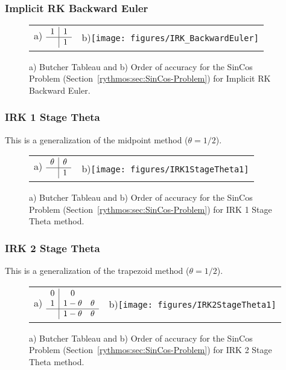 \subsubsection{Implicit RK Backward Euler}

\begin{figure}[H]
\centering{}%
\begin{tabular}{cc}
a) $\begin{array}{c|c}
1 & 1\\
\hline  & 1
\end{array}$ & b)\texttt{[image: figures/IRK\_BackwardEuler]}\tabularnewline
\end{tabular}\caption{a) Butcher Tableau and b) Order of accuracy for the SinCos Problem
(Section~\ref{rythmos:sec:SinCos-Problem}) for Implicit RK Backward
Euler.}
\end{figure}


\subsubsection{IRK 1 Stage Theta}

This is a generalization of the midpoint method ($\theta=1/2$).

\begin{figure}[H]
\centering{}%
\begin{tabular}{cc}
a) $\begin{array}{c|c}
\theta & \theta\\
\hline  & 1
\end{array}$ & b)\texttt{[image: figures/IRK1StageTheta1]}\tabularnewline
\end{tabular}\caption{a) Butcher Tableau and b) Order of accuracy for the SinCos Problem
(Section~\ref{rythmos:sec:SinCos-Problem}) for IRK 1 Stage Theta
method.}
\end{figure}


\subsubsection{IRK 2 Stage Theta}

This is a generalization of the trapezoid method ($\theta=1/2$).

\begin{figure}[H]
\centering{}%
\begin{tabular}{cc}
a) $\begin{array}{c|cc}
0 & 0\\
1 & 1-\theta & \theta\\
\hline  & 1-\theta & \theta
\end{array}$ & b)\texttt{[image: figures/IRK2StageTheta1]}\tabularnewline
\end{tabular}\caption{a) Butcher Tableau and b) Order of accuracy for the SinCos Problem
(Section~\ref{rythmos:sec:SinCos-Problem}) for IRK 2 Stage Theta
method.}
\end{figure}


